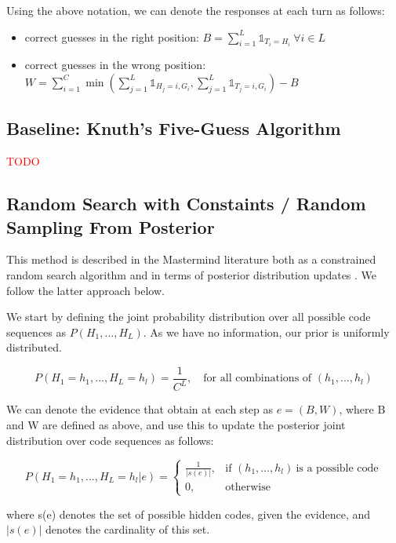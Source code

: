 \documentclass[11pt]{article}
\begin{document}
\noindent Using the above notation, we can denote the responses at each turn as follows:

\begin{itemize}
\item correct guesses in the right position: $B = \sum_{i=1}^L \mathbb{1}_{T_i=H_i} \ \forall i \in L$
\item correct guesses in the wrong position: $W = \sum_{i=1}^{C} \min(\sum_{j=1}^{L}\mathbb{1}_{H_j=i, G_i}, \sum_{j=1}^{L}\mathbb{1}_{T_j=i, G_i}) - B$
\end{itemize}

\subsection{Baseline: Knuth's Five-Guess Algorithm}

\noindent \textcolor{red}{TODO}

\subsection{Random Search with Constaints / Random Sampling From Posterior}

This method is described in the Mastermind literature both as a constrained random search algorithm \cite{bernier1996solving} and in terms of posterior distribution updates \cite{vomlel2004bayesian}. We follow the latter approach below.

We start by defining the joint probability distribution over all possible code sequences as $P(H_1, ..., H_L)$. As we have no information, our prior is uniformly distributed.

\[
P(H_1=h_1, ..., H_L=h_l) = \frac{1}{C^L} ,\quad \text{for all combinations of }(h_1, ..., h_l)
\]

\noindent We can denote the evidence that obtain at each step as $e = (B, W)$, where B and W are defined as above, and use this to update the posterior joint distribution over code sequences as follows:

\[
    P(H_1=h_1, ..., H_L=h_l | e) = 
\begin{cases}
    \frac{1}{|s(e)|},& \text{if } (h_1, ..., h_l) \ \text{is a possible code}\\
    0,              & \text{otherwise}
\end{cases}
\]

\noindent where s(e) denotes the set of possible hidden codes, given the evidence, and $|s(e)|$ denotes the cardinality of this set. \medskip
\end{document}

